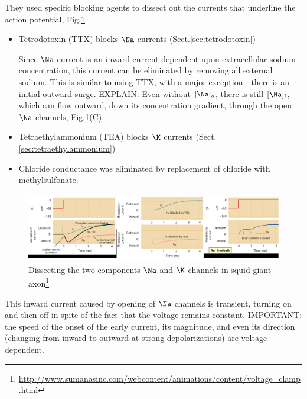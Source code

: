 They used specific blocking agents to dissect out the currents that underline
the action potential, Fig.\ref{fig:HH-experiment-dissect-currents}
\begin{itemize}
  \item Tetrodotoxin (TTX) blocks $\Na$ currents (Sect.\ref{sec:tetrodotoxin})

Since $\Na$ current is an inward current dependent upon extracellular sodium
concentration, this current can be eliminated by removing all external sodium.
This is similar to using TTX, with a major exception - there is an initial
outward surge. EXPLAIN: Even without $[\Na]_o$, there is still $[\Na]_i$, which
can flow outward, down its concentration gradient, through the open $\Na$
channels, Fig.\ref{fig:HH-experiment-dissect-currents}(C).

  \item Tetraethylammonium (TEA) blocks $\K$ currents
  (Sect.\ref{sec:tetraethylammonium})

  \item Chloride conductance was eliminated by replacement of chloride with
  methylsulfonate.
\end{itemize}

\begin{figure}[htb]
  \centerline{\includegraphics[height=3cm]{./images/HH-experiment-dissect-currents.eps}}
  \caption{Dissecting the two components $\Na$ and $\K$ channels in squid giant
  axon\footnote{\url{http://www.sumanasinc.com/webcontent/animations/content/voltage_clamp.html}}}
  \label{fig:HH-experiment-dissect-currents}
\end{figure}

This  inward current caused by opening of $\Na$ channels is transient, turning
on and then off in spite of the fact that the voltage remains constant.
IMPORTANT: the speed of the onset of the early current, its magnitude, and even
its direction (changing from inward to outward at strong depolarizations) are
voltage-dependent.





